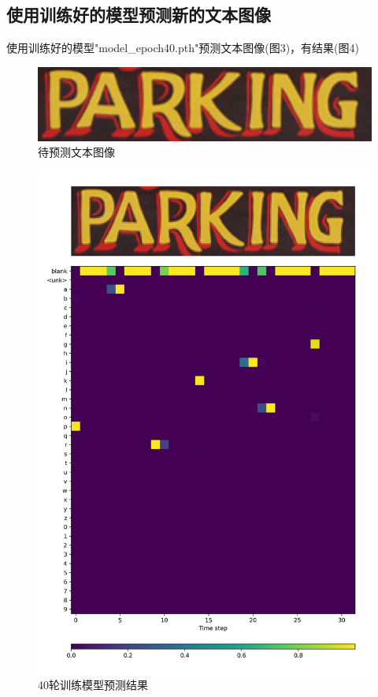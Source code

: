 \documentclass[a4paper]{article}
\begin{document}
\subsection{使用训练好的模型预测新的文本图像}
使用训练好的模型"model\_epoch40.pth"预测文本图像(图3)，有结果(图4) \\
\begin{figure}
    \centering
    \includegraphics[width=12cm]{Fig_3.png}
    \caption{待预测文本图像}
\end{figure}
\begin{figure}
    \centering
    \includegraphics[width=12cm]{Fig_4.jpg}
    \caption{40轮训练模型预测结果}
\end{figure}
\end{document}

